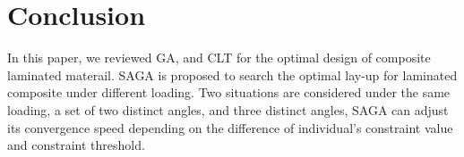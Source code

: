\section{Conclusion}
In this paper, we reviewed GA, and CLT for the optimal design of composite
laminated materail. SAGA is proposed to search the optimal lay-up for laminated
composite under different loading. Two situations are considered under the same
loading, a set of two distinct angles, and three distinct angles, SAGA can
adjust its convergence speed depending on the difference of individual's
constraint value and constraint threshold.  



